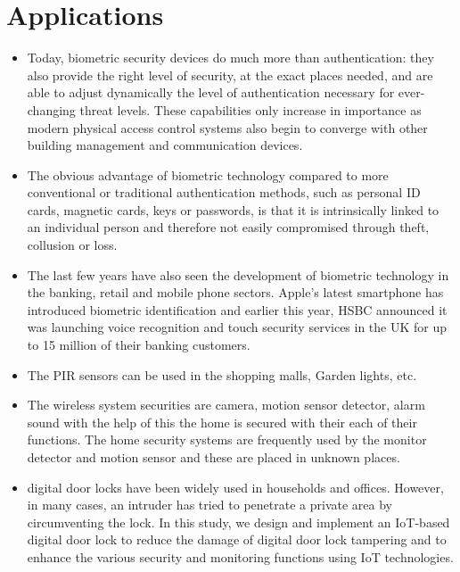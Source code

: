 \documentclass[twoside,a4paper,16pt]{book}
\begin{document}
{{			\section{Applications}
			\begin{itemize}
				\item  Today, biometric security devices do much more than authentication: they also provide the right level of security, at the exact places needed, and are able to adjust dynamically the level of authentication necessary for ever-changing threat levels. These capabilities only increase in importance as modern physical access control systems also begin to converge with other building management and communication devices.
				\item The obvious advantage of biometric technology compared to more conventional or traditional authentication methods, such as personal ID cards, magnetic cards, keys or passwords, is that it is intrinsically linked to an individual person and therefore not easily compromised through theft, collusion or loss.
				\item The last few years have also seen the development of biometric technology in the banking, retail and mobile phone sectors. Apple’s latest smartphone has introduced biometric identification and earlier this year, HSBC announced it was launching voice recognition and touch security services in the UK for up to 15 million of their banking customers.
				\item The PIR sensors can be used in the shopping malls, Garden lights, etc.
				\item The wireless system securities are camera, motion sensor detector, alarm sound with the help of this the home is secured with their each of their functions. The home security systems are frequently used by the monitor detector and motion sensor and these are placed in unknown places.
				\item digital door locks have been widely used in households and offices. However, in many cases, an intruder has tried to penetrate a private area by circumventing the lock. In this study, we design and implement an IoT-based digital door lock to reduce the damage of digital door lock tampering and to enhance the various security and monitoring functions using IoT technologies.
			\end{itemize}
		\begin{figure}
			\centering
			\begin{subfigure}

\end{subfigure}
\end{figure}}}
\end{document}
